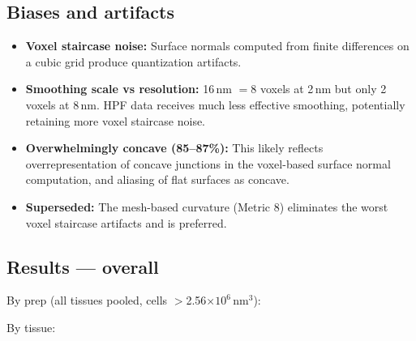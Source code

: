 \documentclass[times, twoside]{zHenriquesLab-StyleBioRxiv}
\begin{document}
\subsection*{Biases and artifacts}
\begin{itemize}[nosep]
\item \textbf{Voxel staircase noise:} Surface normals computed from finite differences on a cubic grid produce quantization artifacts.
\item \textbf{Smoothing scale vs resolution:} 16\,nm $= 8$ voxels at 2\,nm but only 2 voxels at 8\,nm. HPF data receives much less effective smoothing, potentially retaining more voxel staircase noise.
\item \textbf{Overwhelmingly concave (85--87\%):} This likely reflects overrepresentation of concave junctions in the voxel-based surface normal computation, and aliasing of flat surfaces as concave.
\item \textbf{Superseded:} The mesh-based curvature (Metric 8) eliminates the worst voxel staircase artifacts and is preferred.
\end{itemize}

\subsection*{Results --- overall}

By prep (all tissues pooled, cells $>$2.56$\times10^6$\,nm$^3$):

\begin{table}[h]
\centering
{}
\end{table}

By tissue:

\begin{table}[h]
\centering
{}
\end{table}
\end{document}
